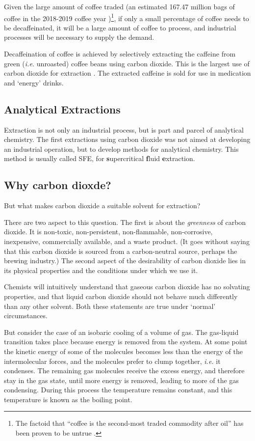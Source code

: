 Given the large amount of coffee traded (an estimated 167.47 million bags of
coffee in the 2018-2019 coffee year \autocite{Coffee2018})\footnote{The factoid
that ``coffee is the second-most traded commodity after oil'' has been proven to
be untrue \autocite{Greenberg2017}.}, if only a small percentage of coffee needs
to be decaffeinated, it will be a large amount of coffee to process, and
industrial processes will be necessary to supply the demand.

Decaffeination of coffee is achieved by selectively extracting the caffeine from
green (\textit{i.e.} unroasted) coffee beans using carbon dioxide. This is the
largest use of carbon dioxide for extraction \autocite{Ramalakshmi1999}. The
extracted caffeine is sold for use in medication and `energy' drinks. 

\subsection{Analytical Extractions}

Extraction is not only an industrial process, but is part and parcel of analytical
chemistry. The first extractions using carbon dioxide was not aimed at developing
an industrial operation, but to develop methods for analytical chemistry. This
method is usually called SFE, for \textbf{s}upercritical \textbf{f}luid
\textbf{e}xtraction.

\subsection{Why carbon dioxde?}

But what makes carbon dioxide a suitable solvent for extraction?

There are two aspect to this question. The first is about the \textit{greenness}
of carbon dioxide. It is non-toxic, non-persistent, non-flammable,
non-corrosive, inexpensive, commercially available, and a waste product. (It
goes without saying that this carbon dioxide is sourced from a carbon-neutral
source, perhaps the brewing industry.) The second aspect of the desirability of
carbon dioxide lies in its physical properties and the conditions under which we
use it.

Chemists will intuitively understand that gaseous carbon dioxide has no solvating
properties, and that liquid carbon dioxide should not behave much differently
than any other solvent. Both these statements are true under `normal' circumstances.

But consider the case of an isobaric cooling of a volume of gas. The gas-liquid
transition takes place because energy is removed from the system. At some point
the kinetic energy of some of the molecules becomes less than the energy of the
intermolecular forces, and the molecules prefer to clump together, \textit{i.e.}
it condenses. The remaining gas molecules receive the excess energy, and
therefore stay in the gas state, until more energy is removed, leading to more
of the gas condensing. During this process the temperature remains constant, and
this temperature is known as the boiling point.

